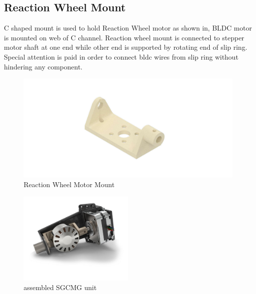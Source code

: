 \subsection{Reaction Wheel Mount}
C shaped mount is used to hold Reaction Wheel motor as shown in, BLDC motor is mounted on web of C channel. Reaction wheel mount is connected to stepper motor shaft at one end while other end is supported by rotating end of slip ring. Special attention is paid in order to connect \acrshort{bldc} wires from slip ring without hindering any component. 

\begin{figure}[ht]
    \centering
    \includegraphics[width=\textwidth]{figures/Assembly/rwMount.pdf}
    \caption{Reaction Wheel Motor Mount }
    \label{fig:RW_MNT}
\end{figure}

\begin{figure}[ht]
    \centering
    \includegraphics[width=0.5\textwidth]{figures/Assembly/sgcmg2.pdf}
    \caption{assembled SGCMG unit}
    \label{fig:SGCMG_ASM}
\end{figure}

